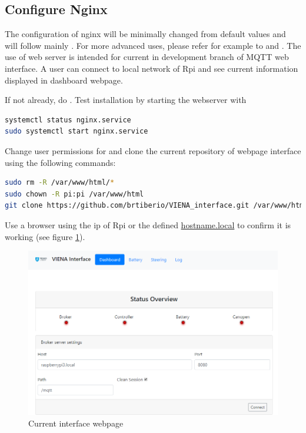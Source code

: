 \subsection{Configure Nginx}
The configuration of nginx will be minimally changed from default values and will follow mainly \cite{raspberry_nginx}. For more advanced uses, please refer for example to \cite{nginx_digitalocean} and \cite{nginx_wiki}. The use of web server is intended for current in development branch of \gls{MQTT} web interface. A user can connect to local network of \gls{Rpi} and see current information displayed in dashboard webpage.

If not already, do . Test installation by starting the webserver with
\begin{lstlisting}[frame=none,language=bash,backgroundcolor=\color{gray!15},numbers=none,		basicstyle=\ttfamily]
systemctl status nginx.service
sudo systemctl start nginx.service
\end{lstlisting}
Change user permissions for  and clone the current repository of webpage interface using the following commands:
\begin{lstlisting}[frame=none,language=bash,backgroundcolor=\color{gray!15},numbers=none,		basicstyle=\ttfamily]
sudo rm -R /var/www/html/*
sudo chown -R pi:pi /var/www/html
git clone https://github.com/brtiberio/VIENA_interface.git /var/www/html
\end{lstlisting}

Use a browser using the ip of \gls{Rpi} or the defined \hyperref[tab:suggested_config]{hostname.local} to confirm it is working (see figure \ref{fig:interface_viena}).
\begin{figure}[!hb]
	\centering
	\includegraphics[width=0.7\linewidth]{figures/viena_interface}
	\caption{Current interface webpage}
	\label{fig:interface_viena}
\end{figure}

